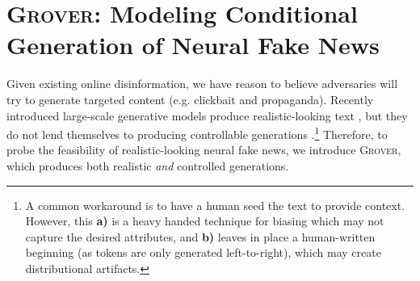 \documentclass{article}
\newcommand{\modelname}{{\textsc{Grover}}}
\begin{document}
%
 
\section{\modelname: Modeling Conditional Generation of Neural Fake News}

\makeatletter
 \def\SOUL@hlpreamble{\setul{}{2.4ex}\let\SOUL@stcolor\SOUL@hlcolor
 \SOUL@stpreamble
 }
\makeatother


\newcommand{\hlc}[2][yellow]{{\colorlet{foo}{#1}\sethlcolor{foo}\hl{#2}}}


\newcommand{\metadata}{metadata}
\newcommand{\Metadata}{Metadata}

\newcommand{\tokenstart}{{\tt\small <start>}}
\newcommand{\tokenend}{{\tt\small <end>}}
\newcommand{\taustart}{{\tt\small <start${-}\tau$>}}
\newcommand{\tauend}{{\tt\small <end${-}\tau$>}}

\newcommand{\bodyfield}{\hlc[body]{body}}
\newcommand{\domainfield}{\hlc[domain]{domain}}
\newcommand{\datefield}{\hlc[date]{date}}
\newcommand{\authorsfield}{\hlc[authors]{authors}}
\newcommand{\authorfield}{\hlc[authors]{author}}
\newcommand{\headlinefield}{\hlc[headline]{headline}}
Given existing online disinformation, we have reason to believe adversaries will try to generate targeted content (e.g. clickbait and propaganda). Recently introduced large-scale generative models produce realistic-looking text \citep{radford2019gpttwo}, but they do not lend themselves to producing controllable generations \citep{hu2017toward}.\footnote{A common workaround is to have a human seed the text to provide context. However, this \textbf{a)} is a heavy handed technique for biasing which may not capture the desired attributes, and \textbf{b)} leaves in place a human-written beginning (as tokens are only generated left-to-right), which may create distributional artifacts.} 
Therefore, to probe the feasibility of realistic-looking neural fake news, we introduce \modelname, which produces both realistic \emph{and} controlled generations.
\end{document}
